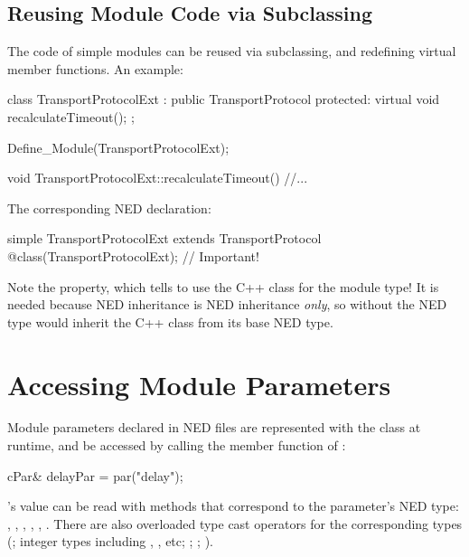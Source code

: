 \subsection{Reusing Module Code via Subclassing}
\label{sec:simple-modules:module-subclassing}

The code of simple modules can be reused via subclassing, and redefining
virtual member functions. An example:

\begin{cpp}
class TransportProtocolExt : public TransportProtocol
{
  protected:
    virtual void recalculateTimeout();
};

Define_Module(TransportProtocolExt);

void TransportProtocolExt::recalculateTimeout()
{
    //...
}
\end{cpp}

The corresponding NED declaration:

\begin{ned}
simple TransportProtocolExt extends TransportProtocol
{
    @class(TransportProtocolExt);  // Important!
}
\end{ned}

\begin{note}
  Note the  property, which tells {\opp} to use the
   C++ class for the module type! It is needed
  because NED inheritance is NED inheritance \textit{only}, so without 
  the  NED type would inherit the C++ class from
  its base NED type.
\end{note}



\section{Accessing Module Parameters}
\label{sec:simple-modules:parameters}

Module parameters declared in NED files are represented with the 
class at runtime, and be accessed
by calling the  member function of :

\begin{cpp}
cPar& delayPar = par("delay");
\end{cpp}

's value can be read with methods that correspond to
the parameter's NED type: , ,
, , ,
.
There are also overloaded type cast operators for the corresponding types
(; integer types including , , etc;
; ; ).

